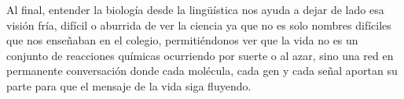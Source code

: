 \documentclass[12pt]{article}
\begin{document}
Al final, entender la biología desde la lingüística nos ayuda a dejar de lado esa visión fría, difícil o aburrida de ver la ciencia ya que no es solo nombres difíciles que nos enseñaban en el colegio, permitiéndonos ver que la vida no es un conjunto de reacciones químicas ocurriendo por suerte o al azar, sino una red en permanente conversación donde cada molécula, cada gen y cada señal aportan su parte para que el mensaje de la vida siga fluyendo.
\end{document}

